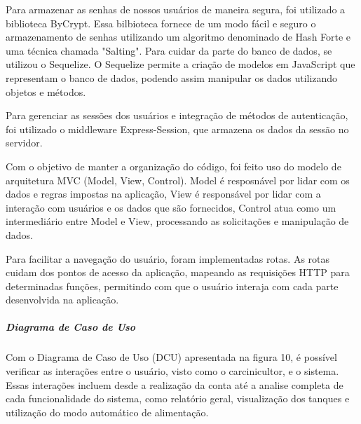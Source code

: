 Para armazenar as senhas de nossos usuários de maneira segura, foi utilizado a biblioteca ByCrypt. Essa bilbioteca fornece de um modo fácil e seguro o armazenamento de senhas utilizando um algoritmo denominado de Hash Forte e uma técnica chamada "Salting". Para cuidar da parte do banco de dados, se utilizou o Sequelize. O Sequelize permite a criação de modelos em JavaScript que representam o banco de dados, podendo assim manipular os dados utilizando objetos e métodos.

Para gerenciar as sessões dos usuários e integração de métodos de autenticação, foi utilizado o middleware Express-Session, que armazena os dados da sessão no servidor.

Com o objetivo de manter a organização do código, foi feito uso do modelo de arquitetura MVC (Model, View, Control). Model é resposnável por lidar com os dados e regras impostas na aplicação, View é responsável por lidar com a interação com usuários e os dados que são fornecidos, Control atua como um intermediário entre Model e View, processando as solicitações e manipulação de dados.

Para facilitar a navegação do usuário, foram implementadas rotas. As rotas cuidam dos pontos de acesso da aplicação, mapeando as requisições HTTP para determinadas funções, permitindo com que o usuário interaja com cada parte desenvolvida na aplicação.

\subparagraph*{\textbf{Diagrama de Caso de Uso}}

Com o Diagrama de Caso de Uso (DCU) apresentada na figura 10, é possível verificar as interações entre o usuário, visto como o carcinicultor, e o sistema. Essas interações incluem desde a realização da conta até a analise completa de cada funcionalidade do sistema, como relatório geral, visualização dos tanques e utilização do modo automático de alimentação.

